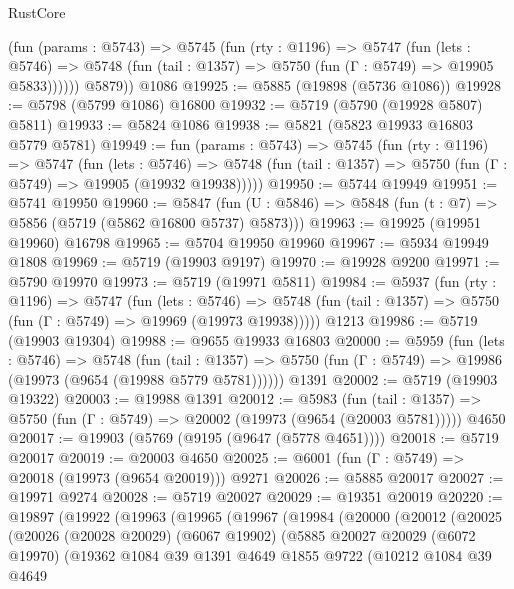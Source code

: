 \begin{lexlean}{RustCore}
\begin{coremodule}
          (fun (params : @5743) =>
          @5745
            (fun (rty : @1196) =>
            @5747
              (fun (lets : @5746) =>
              @5748 (fun (tail : @1357) => @5750 (fun (Γ : @5749) => @19905 @5833))))))
        @5879))
    @1086
@19925 := @5885 (@19898 (@5736 @1086))
@19928 := @5798 (@5799 @1086) @16800
@19932 := @5719 (@5790 (@19928 @5807) @5811)
@19933 := @5824 @1086
@19938 := @5821 (@5823 @19933 @16803 @5779 @5781)
@19949 := fun (params : @5743) =>
  @5745
    (fun (rty : @1196) =>
    @5747
      (fun (lets : @5746) =>
      @5748 (fun (tail : @1357) => @5750 (fun (Γ : @5749) => @19905 (@19932 @19938)))))
@19950 := @5744 @19949
@19951 := @5741 @19950
@19960 := @5847
    (fun (U : @5846) => @5848 (fun (t : @7) => @5856 (@5719 (@5862 @16800 @5737) @5873)))
@19963 := @19925 (@19951 @19960) @16798
@19965 := @5704 @19950 @19960
@19967 := @5934 @19949 @1808
@19969 := @5719 (@19903 @9197)
@19970 := @19928 @9200
@19971 := @5790 @19970
@19973 := @5719 (@19971 @5811)
@19984 := @5937
    (fun (rty : @1196) =>
    @5747
      (fun (lets : @5746) =>
      @5748 (fun (tail : @1357) => @5750 (fun (Γ : @5749) => @19969 (@19973 @19938)))))
    @1213
@19986 := @5719 (@19903 @19304)
@19988 := @9655 @19933 @16803
@20000 := @5959
    (fun (lets : @5746) =>
    @5748
      (fun (tail : @1357) =>
      @5750 (fun (Γ : @5749) => @19986 (@19973 (@9654 (@19988 @5779 @5781))))))
    @1391
@20002 := @5719 (@19903 @19322)
@20003 := @19988 @1391
@20012 := @5983
    (fun (tail : @1357) => @5750 (fun (Γ : @5749) => @20002 (@19973 (@9654 (@20003 @5781)))))
    @4650
@20017 := @19903 (@5769 (@9195 (@9647 (@5778 @4651))))
@20018 := @5719 @20017
@20019 := @20003 @4650
@20025 := @6001 (fun (Γ : @5749) => @20018 (@19973 (@9654 @20019))) @9271
@20026 := @5885 @20017
@20027 := @19971 @9274
@20028 := @5719 @20027
@20029 := @19351 @20019
@20220 := @19897
    (@19922
      (@19963
        (@19965
          (@19967
            (@19984
              (@20000
                (@20012
                  (@20025
                    (@20026
                      (@20028 @20029)
                      (@6067 @19902)
                      (@5885
                        @20027
                        @20029
                        (@6072 @19970)
                        (@19362
                          @1084
                          @39
                          @1391
                          @4649
                          @1855
                          @9722
                          (@10212
                            @1084
                            @39
                            @4649

\end{coremodule}
\end{lexlean}

